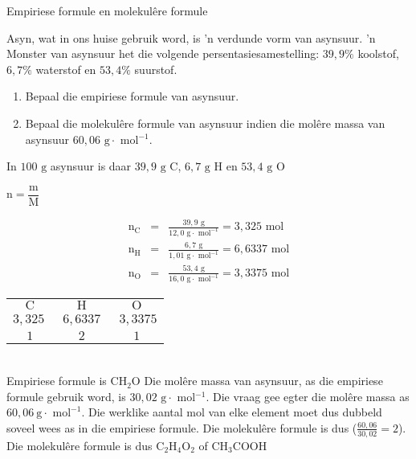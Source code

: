     \noindent
\label{m38712*secfhsst!!!underscore!!!id1308} 
      \noindent 
      \begin{wex}{Empiriese formule en molekul\^{e}re formule
      }
 {
Asyn, wat in ons huise gebruik word, is 'n verdunde vorm van asynsuur. 'n Monster van
      asynsuur het die volgende persentasiesamestelling: $39,9\%$ koolstof, $6,7\%$ waterstof en $53,4\%$ suurstof.  
\begin{enumerate}[noitemsep, label=\textbf{\arabic*}. ] 
\item Bepaal die empiriese formule van asynsuur.
\item Bepaal die molekulêre formule van asynsuur indien die mol\^{e}re massa van asynsuur $60,06 \text{ g} \cdot \text{ mol}{}^{-1}$.
\end{enumerate}
     }
{
      \label{m38712*id281607}In $100 \text{ g}$ asynsuur is daar $39,9 \text{ g C}$, $6,7 \text{ g H}$ en $53,4\text{ g O}$ 

        $\text{n}=\dfrac{\text{m}}{\text{M}}$
      
      \label{m38712*id281653}\nopagebreak\noindent{}
        
    \begin{eqnarray*}
{\text{n}}_{\text{C}} & = & \frac{39,9 \text{ g}}{12,0 \text{ g} \cdot \text{ mol}^{-1}} = 3,325 \text{ mol} \\
{\text{n}}_{\text{H}} & = & \frac{6,7 \text{ g}}{1,01 \text{ g} \cdot \text{ mol}^{-1}} = 6,6337 \text{ mol} \\
{\text{n}}_{\text{O}} & = & \frac{53,4 \text{ g}}{16,0 \text{ g} \cdot \text{ mol}^{-1}} = 3,3375 \text{ mol}
      \end{eqnarray*}
\begin{tabular}{c@{:}c@{:}c}
$\text{C}$ & $\text{H}$ & $\text{O}$\\
$3,325~$ & $~6,6337~$ & $~3,3375$ \\
$1$ & $2$ & $1$\\
\end{tabular}\\
Empiriese formule is $\text{CH}{}_{2}\text{O}$ 
      \label{m38712*id281834}Die mol\^{e}re massa van asynsuur, as die empiriese formule gebruik word, is $30,02 \text{ g} \cdot \text{ mol}{}^{-1}$. Die vraag gee egter die mol\^{e}re massa as $60,06~\text{g}\cdot \text{ mol}^{-1}$. Die werklike aantal mol van elke element moet dus dubbeld soveel wees as in die empiriese formule. Die molekul\^{e}re formule is dus  ($\frac{60,06}{30,02}=2$).
      \label{m38712*id281854}Die molekul\^ere formule is dus $\text{C}{}_{2}\text{H}{}_{4}\text{O}{}_{2}$ of $\text{CH}{}_{3}\text{COOH}$
}
    \end{wex}
